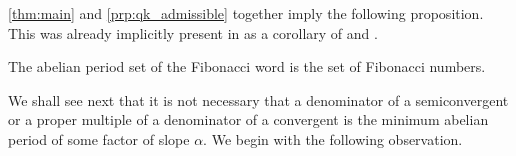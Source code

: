 \documentclass[a4paper,fleqn]{article}
\begin{document}
  \autoref{thm:main} and \autoref{prp:qk_admissible} together imply the following proposition. This was already
  implicitly present in \cite{2016:abelian_powers_and_repetitions_in_sturmian_words} as a corollary of
  \cite[Thm.~6.9]{2016:abelian_powers_and_repetitions_in_sturmian_words} and
  \cite[Thm.~6.12]{2016:abelian_powers_and_repetitions_in_sturmian_words}.

  \begin{proposition}
    The abelian period set of the Fibonacci word is the set of Fibonacci numbers.
  \end{proposition}

  We shall see next that it is not necessary that a denominator of a semiconvergent or a proper multiple of a denominator
  of a convergent is the minimum abelian period of some factor of slope $\alpha$. We begin with the following
  observation.
\end{document}
